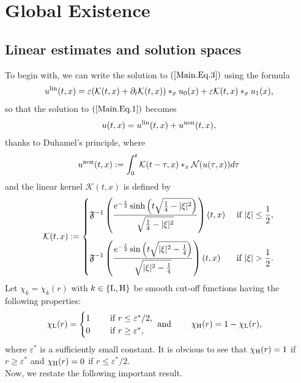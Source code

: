 \documentclass[11pt,reqno]{amsart}
\begin{document}
\section{Global Existence}\label{Section2}
\subsection{Linear estimates and solution spaces} 
To begin with, we can write the solution to $(\ref{Main.Eq.3})$ using the formula
\begin{equation*}
 u^{\rm lin}(t,x) = \varepsilon (\mathcal{K}(t,x) +\partial_t \mathcal{K}(t,x))\ast_x u_0(x) + \varepsilon \mathcal{K}(t,x) \ast_x u_1(x),
\end{equation*}
so that the solution to $(\ref{Main.Eq.1})$ becomes
\begin{align}
    u(t,x)
    = u^{\rm lin}(t,x) + u^{\rm non}(t,x), \label{Solution}
\end{align}
thanks to Duhamel's principle, where
\begin{align*}
    u^{\rm non}(t,x) := \int_0^t \mathcal{K}(t-\tau,x) \ast_x \mathcal{N}(u(\tau,x)) d\tau
\end{align*}
and the linear kernel $\mathcal{K}(t,x)$ is defined by
\begin{align*}
    \mathcal{K}(t,x) :=  \begin{cases}
        \vspace{0.3cm}\mathfrak{F}^{-1}\left(\displaystyle\frac{e^{-\frac{t}{2}}\sinh{\left(t \sqrt{\frac{1}{4} -|\xi|^2}\right)}}{\sqrt{\frac{1}{4}- |\xi|^2}} \right)(t,x) &\text{ if } |\xi| \leq \displaystyle\frac{1}{2},\\
        \displaystyle\mathfrak{F}^{-1}\left(\frac{e^{-\frac{t}{2}}\sin{\left(t \sqrt{|\xi|^2-\frac{1}{4}}\right)}}{\sqrt{|\xi|^2-\frac{1}{4}}}\right)(t,x) &\text{ if } |\xi| > \displaystyle\frac{1}{2}.
    \end{cases}
\end{align*}
Let $\chi_k= \chi_k(r)$ with $k\in\{\rm L,H\}$ be smooth cut-off functions having the following properties:
\begin{align*}
&\chi_{\rm L}(r)=
\begin{cases}
1 &\quad \text{ if }r\le \varepsilon^*/2, \\
0 &\quad \text{ if }r\ge \varepsilon^*,
\end{cases}
\text{ and } \qquad
\chi_{\rm H}(r)= 1 -\chi_{\rm L}(r),
\end{align*}
where $\varepsilon^*$ is a sufficiently small constant.
It is obvious to see that $\chi_{\rm H}(r)= 1$ if $r \geq \varepsilon^*$ and $\chi_{\rm H}(r)= 0$ if $r \le \varepsilon^*/2$.\\
Now, we restate the following important result.
\end{document}
